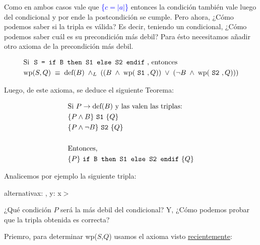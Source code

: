 \documentclass[../main.tex]{subfiles}
\begin{document}
Como en ambos casos vale que \textcolor{blue}{\{$c = |a|$\}} entonces la condición también vale luego del condicional y por ende la postcondición se cumple.
\nln 
Pero ahora, ¿Cómo podemos saber si la tripla es válida? Es decir, teniendo un condicional, ¿Cómo podemos saber cuál es su precondición más debil? Para ésto
necesitamos añadir otro axioma de la precondición más debil.

\begin{align}
    &\text{Si \mono{S = if B then S1 else S2 endif}, entonces} \nonumber \\
    &\text{wp}(S,Q)\;\equiv\;\text{def}(B)\;\yLuego\;((B\;\land\;\text{wp}(\text{\mono{S1}}, Q))\;\lor\;(\neg B\;\land\;\text{wp}(\text{\mono{S2}}, Q)))
\end{align} \label{conditional_wp_axiom}

Luego, de este axioma, se deduce el siguiente Teorema:

\begin{align}
    & \text{Si } P \rightarrow \text{def}(B) \text{ y las valen las triplas:} \nonumber \\
    & \{P \land B\}\text{ \texttt{S1} } \{Q\} \nonumber \\
    & \{P \land \neg B\}\text{ \texttt{S2} } \{Q\} \nonumber \\
    & \nonumber \\
    & \text{Entonces, } \nonumber \\
    & \{P\} \text{ \texttt{if B then S1 else S2 endif} } \{Q\}
\end{align} \label{conditional_wp_theorem}

\newpage
Analicemos por ejemplo la siguiente tripla: \nln
\begin{proc}{alternativa}{\In x: \Z, \Out y: \Z}{}
     x\;$>$  \par
    \;\;   \par
              \par
    \;\;   \par
             \par
\end{proc} \label{alternative_example_triplet}

¿Qué condición $P$ será la más debil del condicional? Y, ¿Cómo podemos probar que la tripla obtenida es correcta?

Priemro, para determinar wp($S$,$Q$) usamos el axioma visto \hyperref[conditional_wp_axiom]{recientemente}:
\end{document}
